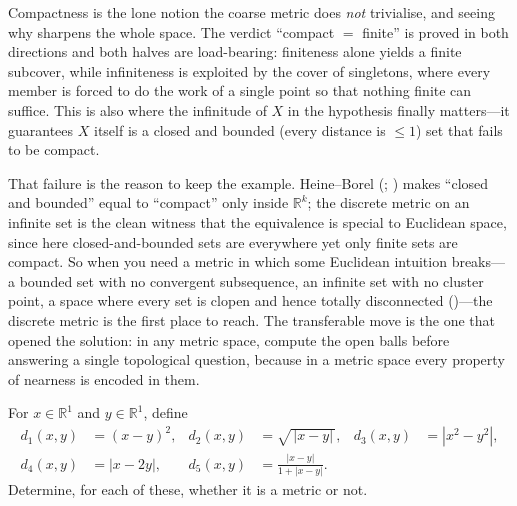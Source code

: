 \documentclass[main.tex]{subfiles}
\begin{document}
\begin{Reflection}
Compactness is the lone notion the coarse metric does \emph{not} trivialise, and seeing why sharpens the
whole space. The verdict ``compact $=$ finite'' is proved in both directions and both halves are
load-bearing: finiteness alone yields a finite subcover, while infiniteness is exploited by the cover of
singletons, where every member is forced to do the work of a single point so that nothing finite can
suffice. This is also where the infinitude of $X$ in the hypothesis finally matters---it guarantees
$X$ itself is a closed and bounded (every distance is $\le 1$) set that fails to be compact.

That failure is the reason to keep the example. Heine--Borel (;
) makes ``closed and
bounded'' equal to ``compact'' only inside $\mathbb R^k$; the discrete metric on an infinite set is the
clean witness that the equivalence is special to Euclidean space, since here closed-and-bounded sets are
everywhere yet only finite sets are compact. So when you need a metric in which some Euclidean intuition
breaks---a bounded set with no convergent subsequence, an infinite set with no cluster point, a space
where every set is clopen and hence totally disconnected ()---the discrete metric is the
first place to reach. The transferable move is the one that opened the solution: in any metric space,
compute the open balls before answering a single topological question, because in a metric space every
property of nearness is encoded in them.
\end{Reflection}

For $x\in\mathbb R^1$ and $y\in\mathbb R^1$, define
\[
\begin{aligned}
d_{1}(x,y)&=(x-y)^{2}, & d_{2}(x,y)&=\sqrt{\,|x-y|\,}, & d_{3}(x,y)&=|x^{2}-y^{2}|,\\
d_{4}(x,y)&=|x-2y|, & d_{5}(x,y)&=\frac{|x-y|}{1+|x-y|}. & &
\end{aligned}
\]
Determine, for each of these, whether it is a metric or not.
\end{document}
